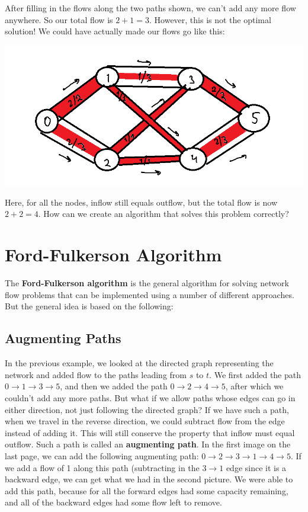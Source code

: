 \documentclass[12pt, letterpaper]{article}
\begin{document}
After filling in the flows along the two paths shown, we can't add any more flow anywhere. So our total flow is $2+1=3$. However, this is not the optimal solution! We could have actually made our flows go like this:

\includegraphics[scale=0.75]{figure4.png}

Here, for all the nodes, inflow still equals outflow, but the total flow is now $2+2=4$. How can we create an algorithm that solves this problem correctly?

\newpage
\section{Ford-Fulkerson Algorithm}
The \textbf{Ford-Fulkerson algorithm} is the general algorithm for solving network flow problems that can be implemented using a number of different approaches. But the general idea is based on the following:

\subsection{Augmenting Paths}
In the previous example, we looked at the directed graph representing the network and added flow to the paths leading from $s$ to $t$. We first added the path $0\rightarrow1\rightarrow3\rightarrow5$, and then we added the path $0\rightarrow2\rightarrow4\rightarrow5$, after which we couldn't add any more paths. But what if we allow paths whose edges can go in either direction, not just following the directed graph? If we have such a path, when we travel in the reverse direction, we could subtract flow from the edge instead of adding it. This will still conserve the property that inflow must equal outflow. Such a path is called an \textbf{augmenting path}. In the first image on the last page, we can add the following augmenting path: $0\rightarrow2\rightarrow3\rightarrow1\rightarrow4\rightarrow5$. If we add a flow of 1 along this path (subtracting in the $3\rightarrow1$ edge since it is a backward edge, we can get what we had in the second picture. We were able to add this path, because for all the forward edges had some capacity remaining, and all of the backward edges had some flow left to remove.
\end{document}
